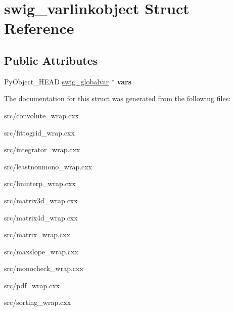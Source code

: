 \hypertarget{structswig__varlinkobject}{
\section{swig\_\-varlinkobject Struct Reference}
\label{d8/d89/structswig__varlinkobject}
}
\subsection*{Public Attributes}
\begin{DoxyCompactItemize}
\item 
\hypertarget{structswig__varlinkobject_a7c03e9f19969e73923a456aefd82ff05}{
PyObject\_\-HEAD \hyperlink{structswig__globalvar}{swig\_\-globalvar} $\ast$ {\bfseries vars}}
\label{d8/d89/structswig__varlinkobject_a7c03e9f19969e73923a456aefd82ff05}

\end{DoxyCompactItemize}


The documentation for this struct was generated from the following files:\begin{DoxyCompactItemize}
\item 
src/convolute\_\-wrap.cxx\item 
src/fittogrid\_\-wrap.cxx\item 
src/integrator\_\-wrap.cxx\item 
src/leastnonmono\_\-wrap.cxx\item 
src/lininterp\_\-wrap.cxx\item 
src/matrix3d\_\-wrap.cxx\item 
src/matrix4d\_\-wrap.cxx\item 
src/matrix\_\-wrap.cxx\item 
src/maxslope\_\-wrap.cxx\item 
src/monocheck\_\-wrap.cxx\item 
src/pdf\_\-wrap.cxx\item 
src/sorting\_\-wrap.cxx\end{DoxyCompactItemize}
